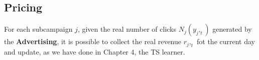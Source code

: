    \subsection{Pricing}
    For each subcampaign $ j $, given the real number of clicks $ N_j(y_j,_t) $ generated by the \textbf{Advertising}, it is possible to collect the real revenue $ r_j,_t $ fot the current day and update, as we have done in Chapter 4, the TS learner.
